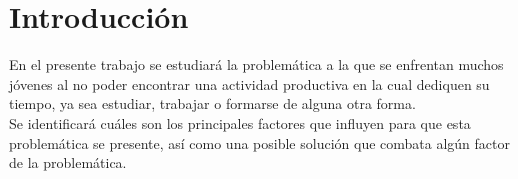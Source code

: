 \chapter{Introducci\'on}



En el presente trabajo se estudiará la problemática a la que se enfrentan muchos jóvenes al no poder encontrar una actividad productiva en la cual dediquen su tiempo, ya sea estudiar, trabajar o formarse de alguna otra forma.\\

Se identificará cuáles son los principales factores que influyen para que esta problemática se presente, así como una posible solución que combata algún factor de la problemática. %

